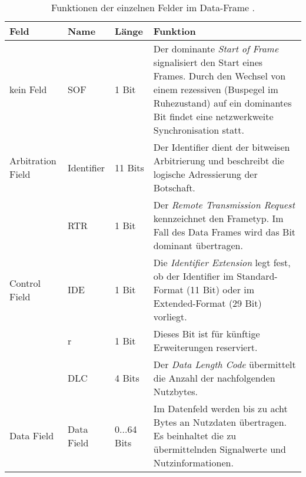 \begin{table}[!htbp]
	\centering
	\caption{Funktionen der einzelnen Felder im Data-Frame \cite{Wallentowitz.2011, Zimmermann.2014}.}
	\footnotesize
	\renewcommand{\arraystretch}{1.3}
	\begin{tabular}{l | l l p{7.5cm}}
		\toprule
		Feld              & Name       & Länge       & Funktion                                                                                                                                                                                                          \\ \midrule
		kein Feld         & SOF        & 1 Bit       & Der dominante \emph{Start of Frame} signalisiert den Start eines Frames. Durch den Wechsel von einem rezessiven (Buspegel im Ruhezustand) auf ein dominantes Bit findet eine netzwerkweite Synchronisation statt. \\
		\midrule
		Arbitration Field & Identifier & 11 Bits     & Der Identifier dient der bitweisen Arbitrierung und beschreibt die logische Adressierung der Botschaft.                                                                                                           \\
		                  & RTR        & 1 Bit       & Der \emph{Remote Transmission Request} kennzeichnet	den Frametyp. Im Fall des Data Frames wird das Bit dominant übertragen.                                                                                       \\
		\midrule
		Control Field & IDE        & 1 Bit       & Die \emph{Identifier Extension} legt fest, ob der Identifier im Standard-Format (11 Bit) oder im Extended-Format (29 Bit) vorliegt.                                                                               \\
		                  & r          & 1 Bit       & Dieses Bit ist für künftige Erweiterungen reserviert.                                                                                                                                                             \\
		                  & DLC        & 4 Bits      & Der \emph{Data Length Code} übermittelt die Anzahl der nachfolgenden Nutzbytes.                                                                                                                                   \\
		\midrule
		Data Field        & Data Field & 0...64 Bits & Im Datenfeld werden bis zu acht Bytes an Nutzdaten übertragen. Es beinhaltet die zu übermittelnden Signalwerte und Nutzinformationen.                                                                             \\

\end{tabular}
\end{table}
